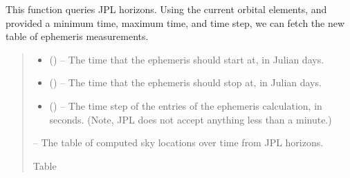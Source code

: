 \documentclass[letterpaper,11pt,english]{sphinxmanual}
\begin{document}
\begin{savenotes}
\begin{fulllineitems}
\begin{savenotes}\begin{fulllineitems}
\label{\detokenize{code/opihiexarata.ephemeris.jplhorizons:opihiexarata.ephemeris.jplhorizons.JPLHorizonsWebAPIEngine._query_jpl_horizons}}
\pysigstartsignatures
{}
\pysigstopsignatures
\sphinxAtStartPar
This function queries JPL horizons. Using the current orbital
elements, and provided a minimum time, maximum time, and time step,
we can fetch the new table of ephemeris measurements.
\begin{quote}\begin{description}
\begin{itemize}
\item {} 
\sphinxAtStartPar
{} () – The time that the ephemeris should start at, in Julian days.

\item {} 
\sphinxAtStartPar
{} () – The time that the ephemeris should stop at, in Julian days.

\item {} 
\sphinxAtStartPar
{} () – The time step of the entries of the ephemeris calculation, in
seconds. (Note, JPL does not accept anything less than a minute.)

\end{itemize}

\sphinxAtStartPar
{} – The table of computed sky locations over time from JPL horizons.

\sphinxAtStartPar
Table

\end{description}\end{quote}

\end{fulllineitems}\end{savenotes}


\end{fulllineitems}
\end{savenotes}
\end{document}
